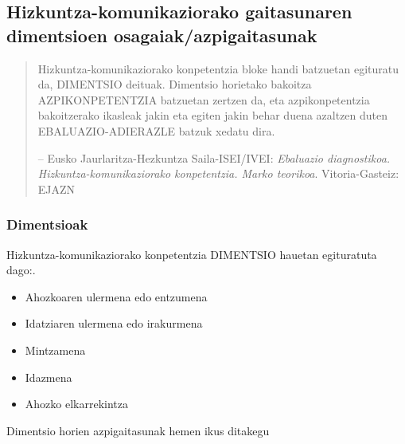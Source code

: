 \documentclass[
]{book}
\providecommand{\tightlist}{%
  \setlength{\itemsep}{0pt}\setlength{\parskip}{0pt}}
\begin{document}
\hypertarget{hizkuntza-komunikaziorako-gaitasunaren-dimentsioen-osagaiakazpigaitasunak}{%
\subsection{Hizkuntza-komunikaziorako gaitasunaren dimentsioen osagaiak/azpigaitasunak}\label{hizkuntza-komunikaziorako-gaitasunaren-dimentsioen-osagaiakazpigaitasunak}}

\begin{quote}
Hizkuntza-komunikaziorako konpetentzia bloke handi batzuetan egituratu da, DIMENTSIO deituak. Dimentsio horietako bakoitza AZPIKONPETENTZIA batzuetan zertzen da, eta azpikonpetentzia bakoitzerako ikasleak jakin eta egiten jakin behar duena azaltzen duten EBALUAZIO-ADIERAZLE batzuk xedatu dira.

-- Eusko Jaurlaritza-Hezkuntza Saila-ISEI/IVEI: \emph{Ebaluazio diagnostikoa. Hizkuntza-komunikaziorako konpetentzia. Marko teorikoa}. Vitoria-Gasteiz: EJAZN
\end{quote}

\hypertarget{dimentsioak}{%
\subsubsection{Dimentsioak}\label{dimentsioak}}

Hizkuntza-komunikaziorako konpetentzia DIMENTSIO hauetan egituratuta dago:.

\begin{itemize}
\tightlist
\item
  Ahozkoaren ulermena edo entzumena
\item
  Idatziaren ulermena edo irakurmena
\item
  Mintzamena
\item
  Idazmena
\item
  Ahozko elkarrekintza
\end{itemize}

Dimentsio horien azpigaitasunak hemen ikus ditakegu
\end{document}

